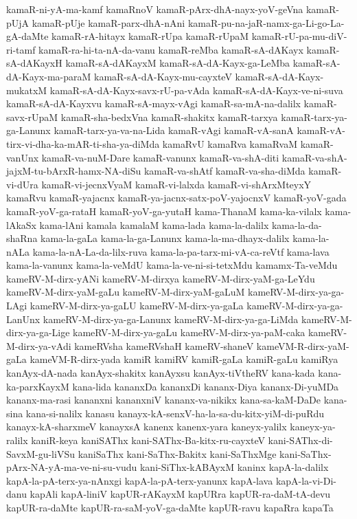 {kamaR-ni-yA-ma-kamf
kamaRnoV
kamaR-pArx-dhA-nayx-yoV-geVna
kamaR-pUjA
kamaR-pUje
kamaR-parx-dhA-nAni
kamaR-pu-na-jaR-namx-ga-Li-go-La-gA-daMte
kamaR-rA-hitayx
kamaR-rUpa
kamaR-rUpaM
kamaR-rU-pa-mu-diV-ri-tamf
kamaR-ra-hi-ta-nA-da-vanu
kamaR-reMba
kamaR-sA-dAKayx
kamaR-sA-dAKayxH
kamaR-sA-dAKayxM
kamaR-sA-dA-Kayx-ga-LeMba
kamaR-sA-dA-Kayx-ma-paraM
kamaR-sA-dA-Kayx-mu-cayxteV
kamaR-sA-dA-Kayx-mukatxM
kamaR-sA-dA-Kayx-savx-rU-pa-vAda
kamaR-sA-dA-Kayx-ve-ni-suva
kamaR-sA-dA-Kayxvu
kamaR-sA-mayx-vAgi
kamaR-sa-mA-na-dalilx
kamaR-savx-rUpaM
kamaR-sha-bedxVna
kamaR-shakitx
kamaR-tarxya
kamaR-tarx-ya-ga-Lanunx
kamaR-tarx-ya-va-na-Lida
kamaR-vAgi
kamaR-vA-sanA
kamaR-vA-tirx-vi-dha-ka-mAR-ti-sha-ya-diMda
kamaRvU
kamaRva
kamaRvaM
kamaR-vanUnx
kamaR-va-nuM-Dare
kamaR-vanunx
kamaR-va-shA-diti
kamaR-va-shA-jajxM-tu-bArxR-hamx-NA-diSu
kamaR-va-shAtf
kamaR-va-sha-diMda
kamaR-vi-dUra
kamaR-vi-jecnxVyaM
kamaR-vi-lalxda
kamaR-vi-shArxMteyxY
kamaRvu
kamaR-yajacnx
kamaR-ya-jacnx-satx-poV-yajocnxV
kamaR-yoV-gada
kamaR-yoV-ga-rataH
kamaR-yoV-ga-yutaH
kama-ThanaM
kama-ka-vilalx
kama-lAkaSx
kama-lAni
kamala
kamalaM
kama-lada
kama-la-dalilx
kama-la-da-shaRna
kama-la-gaLa
kama-la-ga-Lanunx
kama-la-ma-dhayx-dalilx
kama-la-nALa
kama-la-nA-La-da-lilx-ruva
kama-la-pa-tarx-mi-vA-ca-reVtf
kama-lava
kama-la-vanunx
kama-la-veMdU
kama-la-ve-ni-si-tetxMdu
kamamx-Ta-veMdu
kameRV-M-dirx-yANi
kameRV-M-dirxya
kameRV-M-dirx-yaM-ga-LeYdu
kameRV-M-dirx-yaM-gaLu
kameRV-M-dirx-yaM-gaLuM
kameRV-M-dirx-ya-ga-LAgi
kameRV-M-dirx-ya-gaLU
kameRV-M-dirx-ya-gaLa
kameRV-M-dirx-ya-ga-LanUnx
kameRV-M-dirx-ya-ga-Lanunx
kameRV-M-dirx-ya-ga-LiMda
kameRV-M-dirx-ya-ga-Lige
kameRV-M-dirx-ya-gaLu
kameRV-M-dirx-ya-paM-caka
kameRV-M-dirx-ya-vAdi
kameRVsha
kameRVshaH
kameRV-shaneV
kameVM-R-dirx-yaM-gaLa
kameVM-R-dirx-yada
kamiR
kamiRV
kamiR-gaLa
kamiR-gaLu
kamiRya
kanAyx-dA-nada
kanAyx-shakitx
kanAyxsu
kanAyx-tiVtheRV
kana-kada
kana-ka-parxKayxM
kana-lida
kananxDa
kananxDi
kananx-Diya
kananx-Di-yuMDa
kananx-ma-rasi
kananxni
kananxniV
kananx-va-nikikx
kana-sa-kaM-DaDe
kana-sina
kana-si-nalilx
kanasu
kanayx-kA-senxV-ha-la-sa-du-kitx-yiM-di-puRdu
kanayx-kA-sharxmeV
kanayxsA
kanenx
kanenx-yara
kaneyx-yalilx
kaneyx-ya-ralilx
kaniR-keya
kaniSAThx
kani-SAThx-Ba-kitx-ru-cayxteV
kani-SAThx-di-SavxM-gu-liVSu
kaniSaThx
kani-SaThx-Bakitx
kani-SaThxMge
kani-SaThx-pArx-NA-yA-ma-ve-ni-su-vudu
kani-SiThx-kABAyxM
kaninx
kapA-la-dalilx
kapA-la-pA-terx-ya-nAnxgi
kapA-la-pA-terx-yanunx
kapA-lava
kapA-la-vi-Di-danu
kapAli
kapA-liniV
kapUR-rAKayxM
kapURra
kapUR-ra-daM-tA-devu
kapUR-ra-daMte
kapUR-ra-saM-yoV-ga-daMte
kapUR-ravu
kapaRra
kapaTa
}
